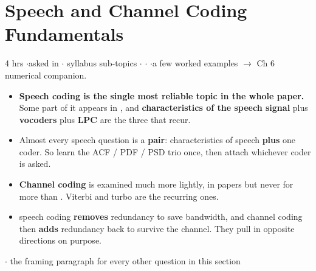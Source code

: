 \section{Speech and Channel Coding Fundamentals}

{\color{sub}\footnotesize 4 hrs \gap$\cdot$\gap asked in 
\gap$\cdot$ syllabus sub-topics \gap$\cdot$\gap {} \gap$\cdot$\gap {} \gap$\cdot$\gap a few worked examples
$\rightarrow$ Ch 6 numerical companion.}

\begin{itemize}
  \item \textbf{Speech coding is the single most reliable topic in the whole paper.} Some part of
        it appears in , and \textbf{characteristics of the speech signal}
         plus \textbf{vocoders}  plus \textbf{LPC}  are the three that recur.
  \item Almost every speech question is a \textbf{pair}: characteristics of speech
        \textbf{plus} one coder. So learn the ACF / PDF / PSD trio once, then attach whichever
        coder is asked.
  \item \textbf{Channel coding} is examined much more lightly, in  papers but never for more
        than . Viterbi  and turbo  are the recurring ones.
  \item {} speech coding \textbf{removes}
        redundancy to save bandwidth, and channel coding then \textbf{adds} redundancy back to
        survive the channel. They pull in opposite directions on purpose.
\end{itemize}

\hr


{\color{sub}\footnotesize {} \gap$\cdot$\gap
the framing paragraph for every other question in this section}

